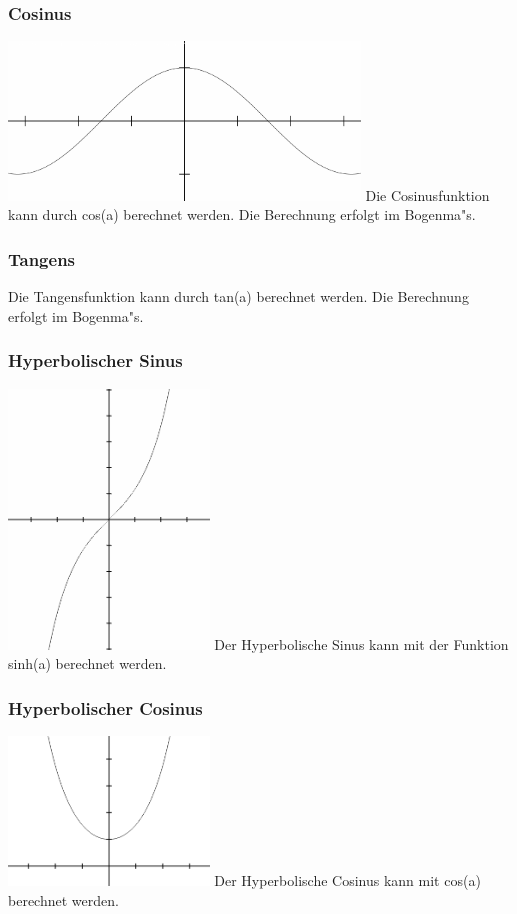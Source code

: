 \documentclass{scrartcl}
\begin{document}
\subsubsection{Cosinus}
\includegraphics[width=0.7\textwidth]{images/functions/cosinus.png}\newline
Die Cosinusfunktion kann durch cos(a) berechnet werden. Die Berechnung erfolgt im Bogenma"s.
\subsubsection{Tangens}
Die Tangensfunktion kann durch tan(a) berechnet werden. Die Berechnung erfolgt im Bogenma"s.
\subsubsection{Hyperbolischer Sinus}
\includegraphics[width=0.4\textwidth]{images/functions/hyperbolic_sinus.png}\newline
Der Hyperbolische Sinus kann mit der Funktion sinh(a) berechnet werden.
\subsubsection{Hyperbolischer Cosinus}
\includegraphics[width=0.4\textwidth]{images/functions/hyperbolic_cosinus.png}\newline
Der Hyperbolische Cosinus kann mit cos(a) berechnet werden.
\end{document}
